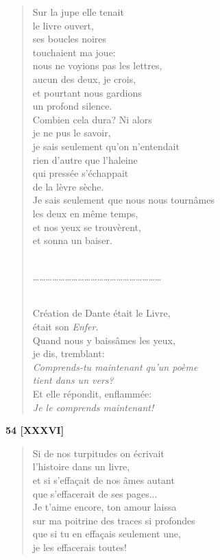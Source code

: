 \documentclass[a4paper,12pt]{book}
\begin{document}
\begin{verse}
Sur la jupe elle tenait \\
le livre ouvert, \\
ses boucles noires \\
touchaient ma joue:\\
nous ne voyions pas les lettres, \\
aucun des deux, je crois, \\
et pourtant nous gardions \\
un profond silence. \\
Combien cela dura? Ni alors \\
je ne pus le savoir, \\
je sais seulement qu'on n'entendait \\
rien d'autre que l'haleine \\
qui pressée s'échappait \\
de la lèvre sèche. \\
Je sais seulement que nous nous tournâmes \\
les deux en même temps, \\
et nos yeux se trouvèrent, \\
et sonna un baiser. \\ \

\ldots\ldots\ldots\ldots\ldots\ldots\ldots\ldots\ldots\ldots\ldots\ldots\ldots\ldots\ldots\ldots\ldots\ldots\ldots\ldots \\ \

Création de Dante était le Livre, \\
était son {\em Enfer}. \\
Quand nous y baissâmes les yeux, \\
je dis, tremblant: \\
{\em Comprends-tu maintenant qu'un poème \\
tient dans un vers?} \\
Et elle répondit, enflammée: \\
{\em Je le comprends maintenant!} \\
\end{verse}

\bigskip

\begin{center} {\bf 54 [XXXVI]} \end{center}

\begin{verse}
Si de nos turpitudes on écrivait \\
l'histoire dans un livre, \\
et si s'effa\c{c}ait de nos âmes autant \\
que s'effacerait de ses pages... \\
Je t'aime encore, ton amour laissa \\
sur ma poitrine des traces si profondes \\
que si tu en effa\c{c}ais seulement une, \\
je les effacerais toutes! \\
\end{verse}
\end{document}
